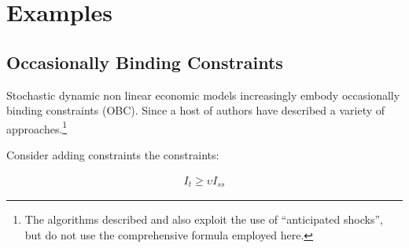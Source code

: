 \documentclass[12pt]{article}
\begin{document}






\section{ Examples}
\label{sec:extension}



\subsection{Occasionally Binding Constraints}
\label{sec:occbind}



\label{sec:obc-solut}

Stochastic dynamic non linear economic
models increasingly embody  occasionally binding constraints (OBC).
Since \cite{Christiano2000} a host of
authors have described a variety of approaches.\footnote{The algorithms described \cite{holden15:_exist_dsge} and \cite{guerrieri15:_occbin} also exploit the use of ``anticipated shocks'', but do not use the comprehensive formula employed here. }
\cite{holden15:_exist_dsge,guerrieri15:_occbin,benigno09,hintermaier10,brumm10,nakov08,haefke98,nakata12,gordon11,billi11,Hintermaier2010,Guerrieri2015}


\label{sec:folag}

Consider adding constraints the constraints:

\begin{gather*}
  I_t \ge \upsilon I_{ss}
\end{gather*}
\end{document}
